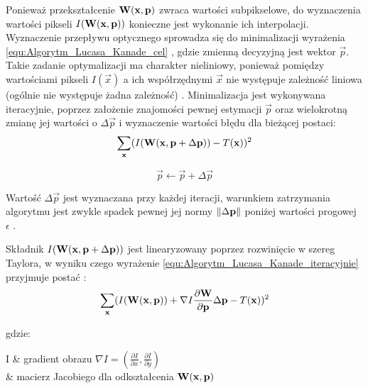 Ponieważ przekształcenie $\mathbf{W}(\mathbf{x}, \mathbf{p})$ zwraca wartości subpikselowe, do wyznaczenia wartości pikseli $I(\mathbf{W}(\mathbf{x}, \mathbf{p}))$ konieczne jest wykonanie ich interpolacji. Wyznaczenie przepływu optycznego sprowadza się do minimalizacji wyrażenia \ref{equ:Algorytm_Lucasa_Kanade_cel} , gdzie zmienną decyzyjną jest wektor $\vec{p}$. Takie zadanie optymalizacji ma charakter nieliniowy, ponieważ pomiędzy wartościami pikseli $I(\vec{x})$ a ich współrzędnymi $\vec{x}$ nie występuje zależność liniowa (ogólnie nie występuje żadna zależność) \cite{Baker2004}. Minimalizacja jest wykonywana iteracyjnie, poprzez założenie znajomości pewnej estymacji $\vec{p}$ oraz wielokrotną zmianę jej wartości o $\Delta \vec{p}$ i wyznaczenie wartości błędu dla bieżącej postaci:
\begin{equation}
\label{equ:Algorytm_Lucasa_Kanade_iteracyjnie}
	\sum\limits_{\mathbf{x}} (I(\mathbf{W}(\mathbf{x}, \mathbf{p} + \Delta \mathbf{p})) - T(\mathbf{x}))^2
\end{equation}

\begin{equation}
\label{equ:Algorytm_Lucasa_Kanade_podstawienie}
	\vec{p} \gets \vec{p} + \Delta \vec{p}
\end{equation}

Wartość $\Delta \vec{p}$ jest wyznaczana przy każdej iteracji, warunkiem zatrzymania algorytmu jest zwykle spadek pewnej jej normy $\lVert\Delta \mathbf{p}\rVert$ poniżej wartości progowej $\epsilon$ \cite{Baker2004}. 

Składnik $I(\mathbf{W}(\mathbf{x}, \mathbf{p} + \Delta \mathbf{p}))$ jest linearyzowany poprzez rozwinięcie w szereg Taylora, w wyniku czego wyrażenie \ref{equ:Algorytm_Lucasa_Kanade_iteracyjnie} przyjmuje postać \cite{Baker2004}:
\begin{equation}
\label{equ:Algorytm_Lucasa_Kanade_Taylor}
	\sum\limits_{\mathbf{x}} (I(\mathbf{W}(\mathbf{x}, \mathbf{p})) + \nabla I \frac{\partial \mathbf{W}}{\partial \mathbf{p}} \Delta \mathbf{p} - T(\mathbf{x}))^2
\end{equation}

\noindent
gdzie:

\begin{conditions}
	\nabla I & gradient obrazu $\nabla I = (\frac{\partial I}{\partial x}, \frac{\partial I}{\partial y})$ \\
	 & macierz Jacobiego dla odkształcenia $\mathbf{W}(\mathbf{x}, \mathbf{p})$ \\
\end{conditions}

